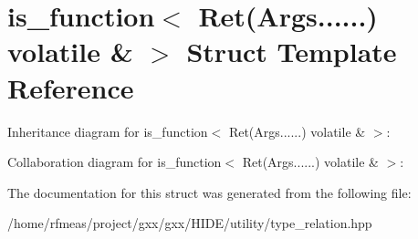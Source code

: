 \hypertarget{structis__function_3_01Ret_07Args_8_8_8_8_8_8_08_01volatile_01_6_01_4}{}\section{is\+\_\+function$<$ Ret(Args......) volatile \& $>$ Struct Template Reference}
\label{structis__function_3_01Ret_07Args_8_8_8_8_8_8_08_01volatile_01_6_01_4}


Inheritance diagram for is\+\_\+function$<$ Ret(Args......) volatile \& $>$\+:


Collaboration diagram for is\+\_\+function$<$ Ret(Args......) volatile \& $>$\+:


The documentation for this struct was generated from the following file\+:\begin{DoxyCompactItemize}
\item 
/home/rfmeas/project/gxx/gxx/\+H\+I\+D\+E/utility/type\+\_\+relation.\+hpp\end{DoxyCompactItemize}
